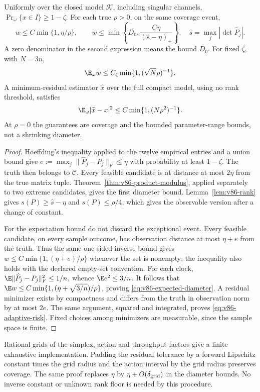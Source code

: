 \begin{theorem}
\label{thm:v86-adaptive}
Uniformly over the closed model $\mathcal K$, including singular
channels, $\Pr_\omega\{x\in I\}\ge1-\zeta$.
For each true $\rho>0$, on the same coverage event,
\begin{equation}\label{eq:v86-adaptive-diameter}
 w\le C\min\{1,\eta/\rho\},\qquad
 w\le\min\left\{D_0,
            \frac{C\eta}{(\widehat s-\eta)_+}\right\},\quad
       \widehat s=\max_j|\det\widehat P_j|.
\end{equation}
A zero denominator in the second expression means the bound $D_0$.
For fixed $\zeta$, with $N=3n$,
\begin{equation}\label{eq:v86-expected-diameter}
      \E_\omega w\le C_\zeta
                          \min\{1,(\sqrt N\rho)^{-1}\}.
\end{equation}
A minimum-residual estimator $\widehat x$ over the full compact model,
using no rank threshold, satisfies
\begin{equation}\label{eq:v86-adaptive-risk}
      \E_\omega|\widehat x-x|^2
                         \le C\min\{1,(N\rho^2)^{-1}\}.
\end{equation}
At $\rho=0$ the guarantees are coverage and the bounded parameter-range
bounds, not a shrinking diameter.
\end{theorem}
\begin{proof}
Hoeffding's inequality applied to the twelve empirical entries and a
union bound give $e:=\max_j\|\widehat P_j-P_j\|_F\le\eta$ with
probability at least $1-\zeta$. The truth then belongs to $\mathcal C$.
Every feasible candidate is at distance at most $2\eta$ from the true
matrix tuple. Theorem~\ref{thm:v86-product-modulus}, applied separately
to two extreme candidates, gives the first diameter bound.
Lemma~\ref{lem:v86-rank} gives $s(P)\ge\widehat s-\eta$ and
$s(P)\le\rho/4$, which gives the observable version after a change
of constant.

For the expectation bound do not discard the exceptional event. Every
feasible candidate, on every sample outcome, has observation distance
at most $\eta+e$ from the truth. Thus the same one-sided inverse bound
gives $w\le C\min\{1,(\eta+e)/\rho\}$ whenever the set is nonempty;
the inequality also holds with the declared empty-set convention.
For each clock,
$\E\|\widehat P_j-P_j\|_F^2\le1/n$, whence
$\E e^2\le3/n$. It follows that
$\E w\le C\min\{1,(\eta+\sqrt{3/n})/\rho\}$, proving
\eqref{eq:v86-expected-diameter}. A residual minimizer exists by
compactness and differs from the truth in observation norm by at most
$2e$. The same argument, squared and integrated, proves
\eqref{eq:v86-adaptive-risk}. Fixed choices among minimizers are
measurable, since the sample space is finite.
\end{proof}
Rational grids of the simplex, action and throughput factors give a
finite exhaustive implementation. Padding the residual tolerance by a
forward Lipschitz constant times the grid radius and the action interval
by the grid radius preserves coverage. The same proof replaces $\eta$
by $\eta+O(\delta_{\rm grid})$ in the diameter bounds. No inverse
constant or unknown rank floor is needed by this procedure.

